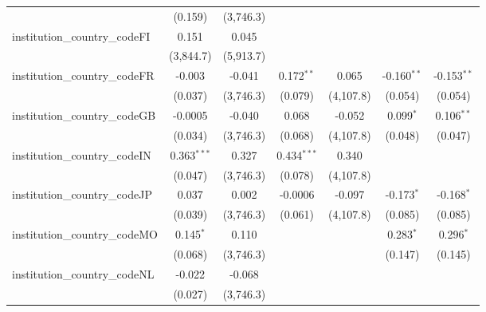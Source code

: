 \begin{tabular}{lcccccc}
                                         & (0.159)        & (3,746.3)     &               &               &                &   \\   
   institution\_country\_codeFI          & 0.151          & 0.045         &               &               &                &   \\   
                                         & (3,844.7)      & (5,913.7)     &               &               &                &   \\   
   institution\_country\_codeFR          & -0.003         & -0.041        & 0.172$^{**}$  & 0.065         & -0.160$^{**}$  & -0.153$^{**}$\\   
                                         & (0.037)        & (3,746.3)     & (0.079)       & (4,107.8)     & (0.054)        & (0.054)\\   
   institution\_country\_codeGB          & -0.0005        & -0.040        & 0.068         & -0.052        & 0.099$^{*}$    & 0.106$^{**}$\\   
                                         & (0.034)        & (3,746.3)     & (0.068)       & (4,107.8)     & (0.048)        & (0.047)\\   
   institution\_country\_codeIN          & 0.363$^{***}$  & 0.327         & 0.434$^{***}$ & 0.340         &                &   \\   
                                         & (0.047)        & (3,746.3)     & (0.078)       & (4,107.8)     &                &   \\   
   institution\_country\_codeJP          & 0.037          & 0.002         & -0.0006       & -0.097        & -0.173$^{*}$   & -0.168$^{*}$\\   
                                         & (0.039)        & (3,746.3)     & (0.061)       & (4,107.8)     & (0.085)        & (0.085)\\   
   institution\_country\_codeMO          & 0.145$^{*}$    & 0.110         &               &               & 0.283$^{*}$    & 0.296$^{*}$\\   
                                         & (0.068)        & (3,746.3)     &               &               & (0.147)        & (0.145)\\   
   institution\_country\_codeNL          & -0.022         & -0.068        &               &               &                &   \\   
                                         & (0.027)        & (3,746.3)     &               &               &                &   \\   

\end{tabular}
